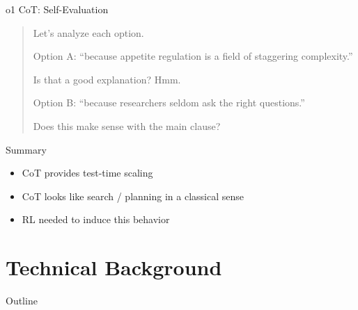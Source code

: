 \documentclass[14pt,aspectratio=169]{beamer}
\begin{document}
\begin{frame}{o1 CoT: Self-Evaluation}

	\begin{tcolorbox}[colback=white,colframe=black,boxrule=0.5pt]
		\begin{quote}

			Let’s analyze each option.

			Option A: “because appetite regulation is a field of staggering complexity.”

			Is that a good explanation? Hmm.

			Option B: “because researchers seldom ask the right questions.”

			Does this make sense with the main clause?
		\end{quote}
	\end{tcolorbox}
\end{frame}

\begin{frame}{Summary}
	\begin{itemize}
		\item CoT provides test-time scaling
		\item CoT looks like search / planning in a classical sense
		\item RL needed to induce this behavior
	\end{itemize}
\end{frame}

\section{Technical Background}

\begin{frame}{Outline}
	\tableofcontents[hideallsubsections]
\end{frame}
\end{document}
